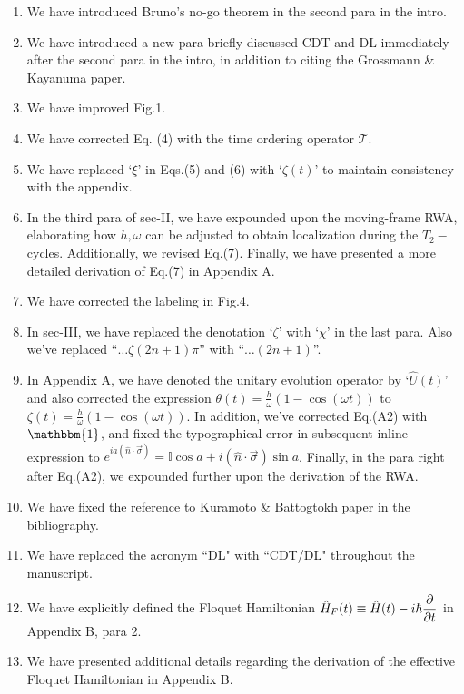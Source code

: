\documentclass[aps,prb,reprint,showpacs,floatfix,superscriptaddress, onecolumn, nofootinbib, 9pt]{revtex4-2}
\begin{document}
\begin{enumerate}
\item We have introduced Bruno's no-go theorem in the second para in the intro.
\item We have introduced a new para  briefly discussed CDT and DL immediately after the second para in the intro, in addition to citing the Grossmann \& Kayanuma paper. 
\item We have improved Fig.1.
\item We have corrected Eq. (4) with the time ordering operator $\mathcal{T}$.
\item We have replaced `$\xi$' in Eqs.(5) and (6) with `$\zeta(t)$' to maintain consistency with the  appendix.
\item In the third para of sec-II, we have expounded upon the moving-frame RWA, elaborating how $h,\omega$ can be adjusted to obtain  localization during the $T_2-$cycles. Additionally, we revised Eq.(7). Finally, we have presented a more detailed derivation of Eq.(7) in Appendix A.
\item We have corrected the labeling in Fig.4.
\item In sec-III, we have replaced the denotation `$\zeta$' with `$\chi$'  in the last para. Also we've replaced ``$\dots\zeta(2n+1)\pi$'' with ``$\dots (2n+1)$''.
\item In Appendix A, we have denoted the unitary evolution operator by `$\hat{U}(t)$' and also corrected the expression $\theta(t) = \frac{h}{\omega}(1-\cos(\omega t))$ to $\zeta(t) = \frac{h}{\omega}(1-\cos(\omega t))$. In addition, we've corrected Eq.(A2) with $\mathbbm{1}$, and fixed the typographical error in subsequent inline expression to 
$e^{i a\left(\hat{n} \cdot \vec{\sigma}\right)} = \mathbb{I}\cos{a} + i (\hat{n} \cdot \vec{\sigma}) \sin{a}$. Finally, in the para right after Eq.(A2), we expounded further upon the derivation of the RWA.

\item We have fixed the reference to Kuramoto \& Battogtokh paper in the bibliography.
\item We have replaced the acronym ``DL" with ``CDT/DL" throughout the manuscript.

\item We have explicitly defined the Floquet Hamiltonian $\displaystyle \hat{H}_F(t) \equiv \hat{H}(t) - i\hbar \pdv{t}$ in Appendix B, para 2.

\item We have presented additional details regarding the derivation of the effective Floquet Hamiltonian in Appendix B.
\end{enumerate}


\end{document}
